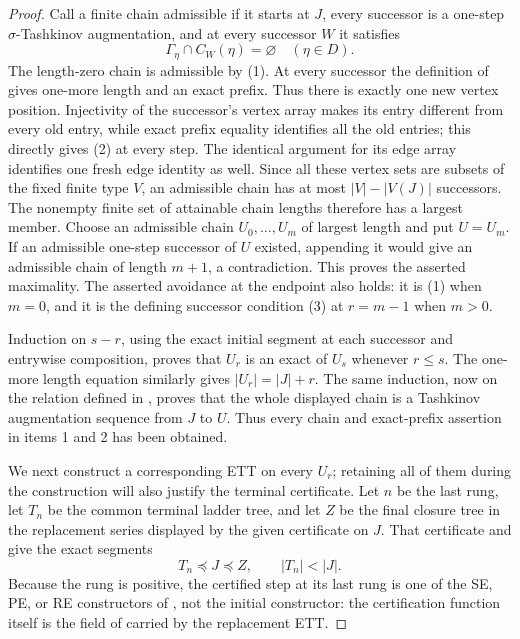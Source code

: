 \begin{proof}
Call a finite chain admissible if it starts at $J$, every successor is a
one-step $\sigma$-Tashkinov augmentation, and at every successor $W$ it
satisfies
\[
                    \Gamma_\eta\cap C_W(\eta)=\varnothing
                    \quad(\eta\in D).                 \tag{3}
\]
The length-zero chain is admissible by (1).  At every successor the
definition of  gives one-more length and an
exact prefix.  Thus there is exactly one new vertex position.  Injectivity
of the successor's vertex array makes its entry different from every old
entry, while exact prefix equality identifies all the old entries; this
directly gives (2) at every step.  The identical argument for its edge
array identifies one fresh edge identity as well.  Since all these
vertex sets are subsets of the fixed finite type $V$, an admissible chain
has at most $|V|-|V(J)|$ successors.  The nonempty finite set of attainable
chain lengths therefore has a largest member.  Choose an admissible chain
$U_0,\ldots,U_m$ of largest length and put $U=U_m$.  If an admissible
one-step successor of $U$ existed, appending it would give an admissible
chain of length $m+1$, a contradiction.  This proves the asserted
maximality.  The asserted avoidance at the endpoint also holds: it is (1)
when $m=0$, and it is the defining successor condition (3) at $r=m-1$
when $m>0$.

Induction on $s-r$, using the exact initial segment at each successor and
entrywise composition, proves that $U_r$ is an exact
 of $U_s$ whenever $r\leq s$.
The one-more length equation similarly gives $|U_r|=|J|+r$.  The same
induction, now on the relation defined in
, proves that the whole displayed
chain is a Tashkinov augmentation sequence from $J$ to $U$.  Thus every
chain and exact-prefix assertion in items 1 and 2 has been obtained.

We next construct a corresponding ETT on every $U_r$; retaining all of
them during the construction will also justify the terminal certificate.
Let $n$ be the last rung, let $T_n$ be the common terminal ladder tree,
and let $Z$ be the final closure tree in the replacement series displayed
by the given  certificate on
$J$.  That certificate and  give the exact
segments
\[
                         T_n\preccurlyeq J\preccurlyeq Z,
                         \qquad |T_n|<|J|.              \tag{4}
\]
Because the rung is positive, the certified step at its last rung is one
of the SE, PE, or RE constructors of , not
the initial constructor: the certification function itself is the field of
 carried by the replacement ETT.


\end{proof}
